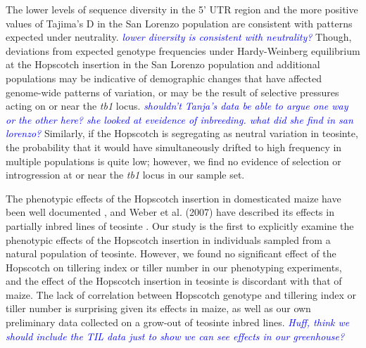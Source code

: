 \documentclass[12pt]{article}
\newcommand{\jri}[1]{\textcolor{blue}{ \emph{\scriptsize  #1}} }
\begin{document}
The lower levels of sequence diversity in the 5' UTR region and the more positive values of Tajima's D in the San Lorenzo population are consistent with patterns expected under neutrality. \jri{lower diversity is consistent with neutrality?} Though, deviations from expected genotype frequencies under Hardy-Weinberg equilibrium at the Hopscotch insertion in the San Lorenzo population and additional populations may be indicative of demographic changes that have affected genome-wide patterns of variation, or may be the result of selective pressures acting on or near the \emph{tb1} locus. \jri{shouldn't Tanja's data be able to argue one way or the other here? she looked at eveidence of inbreeding. what did she find in san lorenzo?} Similarly, if the Hopscotch is segregating as neutral variation in teosinte, the probability that it would have simultaneously drifted to high frequency in multiple populations is quite low; however, we find no evidence of selection or introgression at or near the \emph{tb1} locus in our sample set.

The phenotypic effects of the Hopscotch insertion in domesticated maize have been well documented \cite{Clark et al 2006, Studer et al 2011}, and Weber et al. (2007) have described its effects in partially inbred lines of teosinte \cite{Weber et al 2007}. Our study is the first to explicitly examine the phenotypic effects of the Hopscotch insertion in individuals sampled from a natural population of teosinte. However, we found no significant effect of the Hopscotch on tillering index or tiller number in our phenotyping experiments, and the effect of the Hopscotch insertion in teosinte is discordant with that of maize. The lack of correlation between Hopscotch genotype and tillering index or tiller number is surprising given its effects in maize, as well as our own preliminary data collected on a grow-out of teosinte inbred lines. \jri{Huff, think we should include the TIL data just to show we can see effects in our greenhouse?}
\end{document}
